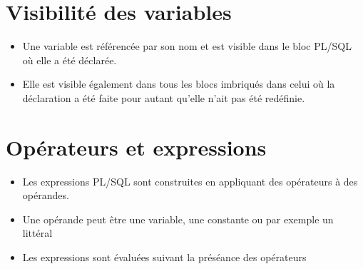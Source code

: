 \documentclass[10pt]{beamer}
\begin{document}
\section{Visibilité des variables}
\begin{frame}{\secname}
    \begin{itemize}
        \item Une variable est référencée par son nom et est visible dans le bloc PL/SQL où elle a été déclarée.
        \item Elle est visible également dans tous les blocs imbriqués dans celui où la déclaration a été faite pour autant qu'elle n'ait pas été redéfinie.
    \end{itemize}
\end{frame}
\begin{frame}{\secname}
    
\end{frame}

\section{Opérateurs et expressions}
\begin{frame}{\secname}
    \begin{itemize}
        \item Les expressions PL/SQL sont construites en appliquant des opérateurs à des opérandes.
        \item Une opérande peut être une variable, une constante ou par exemple un littéral
        \item Les expressions sont évaluées suivant la préséance des opérateurs
    \end{itemize}
\end{frame}
\end{document}
